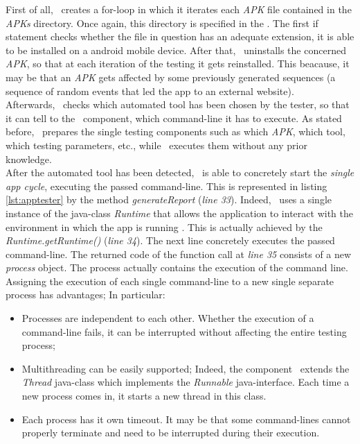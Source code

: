 First of all, \AppTester\ creates a for-loop in which it iterates each \textit{APK} file contained in the \textit{APKs} directory. Once again, this directory is specified in the \Config. 
The first if statement checks whether the file in question has an adequate extension, \ie it is able to be installed on a android mobile device. 
After that, \AppTester\ uninstalls the concerned \textit{APK}, so that at each iteration of the testing it gets reinstalled. 
This beacause, it may be that an \textit{APK} gets affected by some previously generated sequences (\eg a sequence of random events that led the app to an external website). \\
Afterwards, \AppTester\ checks which automated tool has been chosen by the tester, so that it can tell to the \Cmd\ component, which command-line it has to execute. As stated before, \AppTester\ prepares the single testing components such as which \textit{APK}, which tool, which testing parameters, etc., while \Cmd\ executes them without any prior knowledge. \\
After the automated tool has been detected, \Cmd\ is able to concretely start the \textit{single app cycle}, executing the passed command-line. This is represented in listing \ref{lst:apptester} by the method \textit{generateReport} (\textit{line 33}). Indeed, \Cmd\ uses a single instance of the java-class \textit{Runtime} that allows the application to interact with the environment in which the app is running \cite{runtime}. 
This is actually achieved by the \textit{Runtime.getRuntime()} (\textit{line 34}). The next line concretely executes the passed command-line. 
The returned code of the function call at \textit{line 35} consists of a new \textit{process} object. 
The process actually contains the execution of the command line. 
Assigning the execution of each single command-line to a new single separate process has advantages; In particular: 
\begin{itemize}
\item Processes are independent to each other. 
Whether the execution of a command-line fails, it can be interrupted without affecting the entire testing process; 
\item Multithreading can be easily supported; Indeed, the component \Stream\ extends the \textit{Thread} java-class which implements the \textit{Runnable} java-interface. Each time a new process comes in, it starts a new thread in this class.
\item Each process has it own timeout. It may be that some command-lines cannot properly terminate and need to be interrupted during their execution.  
\end{itemize}
